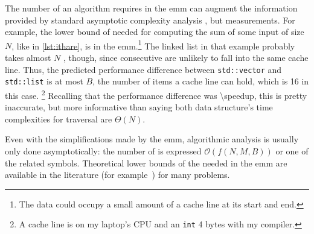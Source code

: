 The number of  an algorithm requires in the \gls{emm} can augment the
information provided by standard asymptotic complexity analysis%
,
but  measurements.
For example, the lower bound of  needed for computing the sum of some
input of size \(N\), like in \cref{lst:ithare}, is
in the \gls{emm}.\footnote{%
   The data could occupy a small amount of a cache line at its start and end.
}
The linked list in that example probably takes almost \(N\) ,
though, since consecutive  are unlikely to fall into the same cache
line.  Thus, the predicted performance difference between \texttt{std::vector}
and \texttt{std::list} is at most \(B\), the number of items a cache line can
hold, which is \si{16} in this case.%
\footnote{%
  A cache line is  on my laptop's CPU and an
  \texttt{int} \si{4} bytes with my compiler.
}
Recalling that the  performance difference was
\num[round-mode=places, round-precision=0]{\speedup}, this is pretty inaccurate, but more
informative than saying both  data structure's time complexities for
traversal are  \(\Theta(N)\).


Even with the simplifications made by the \gls{emm}, algorithmic analysis is usually only
done asymptotically: the number of  is expressed 
\(\mathcal{O}\left(f\left(N, M, B\right)\right)\) or one of the related symbols.
Theoretical lower bounds of the  needed in the \gls{emm} are available in
the literature (for example~\cite{afmh}) for many problems.



